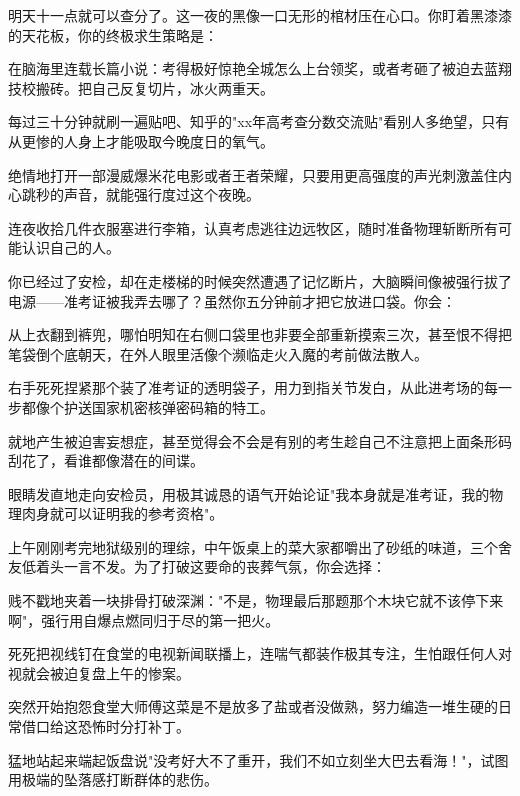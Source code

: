 \documentclass{exam-zh}
\begin{document}
\begin{question}[points = 5]
  明天十一点就可以查分了。这一夜的黑像一口无形的棺材压在心口。你盯着黑漆漆的天花板，你的终极求生策略是：
  \begin{choices}
    \item 在脑海里连载长篇小说：考得极好惊艳全城怎么上台领奖，或者考砸了被迫去蓝翔技校搬砖。把自己反复切片，冰火两重天。
    \item 每过三十分钟就刷一遍贴吧、知乎的"xx年高考查分数交流贴"看别人多绝望，只有从更惨的人身上才能吸取今晚度日的氧气。
    \item 绝情地打开一部漫威爆米花电影或者王者荣耀，只要用更高强度的声光刺激盖住内心跳秒的声音，就能强行度过这个夜晚。
    \item 连夜收拾几件衣服塞进行李箱，认真考虑逃往边远牧区，随时准备物理斩断所有可能认识自己的人。
  \end{choices}
\end{question}

\begin{question}[points = 5]
  你已经过了安检，却在走楼梯的时候突然遭遇了记忆断片，大脑瞬间像被强行拔了电源——准考证被我弄去哪了？虽然你五分钟前才把它放进口袋。你会：
  \begin{choices}
    \item 从上衣翻到裤兜，哪怕明知在右侧口袋里也非要全部重新摸索三次，甚至恨不得把笔袋倒个底朝天，在外人眼里活像个濒临走火入魔的考前做法散人。
    \item 右手死死捏紧那个装了准考证的透明袋子，用力到指关节发白，从此进考场的每一步都像个护送国家机密核弹密码箱的特工。
    \item 就地产生被迫害妄想症，甚至觉得会不会是有别的考生趁自己不注意把上面条形码刮花了，看谁都像潜在的间谍。
    \item 眼睛发直地走向安检员，用极其诚恳的语气开始论证"我本身就是准考证，我的物理肉身就可以证明我的参考资格"。
  \end{choices}
\end{question}

\begin{question}[points = 5]
  上午刚刚考完地狱级别的理综，中午饭桌上的菜大家都嚼出了砂纸的味道，三个舍友低着头一言不发。为了打破这要命的丧葬气氛，你会选择：
  \begin{choices}
    \item 贱不戳地夹着一块排骨打破深渊："不是，物理最后那题那个木块它就不该停下来啊"，强行用自爆点燃同归于尽的第一把火。
    \item 死死把视线钉在食堂的电视新闻联播上，连喘气都装作极其专注，生怕跟任何人对视就会被迫复盘上午的惨案。
    \item 突然开始抱怨食堂大师傅这菜是不是放多了盐或者没做熟，努力编造一堆生硬的日常借口给这恐怖时分打补丁。
    \item 猛地站起来端起饭盘说"没考好大不了重开，我们不如立刻坐大巴去看海！"，试图用极端的坠落感打断群体的悲伤。
  \end{choices}
\end{question}
\end{document}
